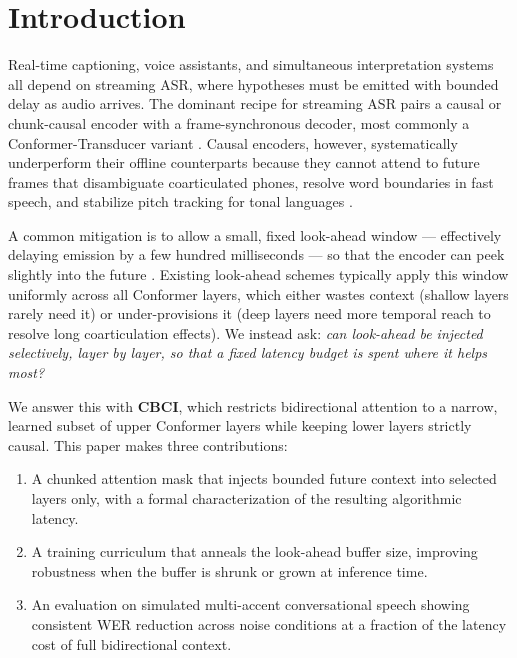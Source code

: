 \section{Introduction}
Real-time captioning, voice assistants, and simultaneous interpretation systems all depend on streaming
ASR, where hypotheses must be emitted with bounded delay as audio arrives. The dominant recipe for
streaming ASR pairs a causal or chunk-causal encoder with a frame-synchronous decoder, most commonly a
Conformer-Transducer variant \citep{okonkwo2024conformer,fischer2020ctc}. Causal encoders, however,
systematically underperform their offline counterparts because they cannot attend to future frames that
disambiguate coarticulated phones, resolve word boundaries in fast speech, and stabilize pitch tracking
for tonal languages \citep{schmidt2023wav2vec}.

A common mitigation is to allow a small, fixed look-ahead window --- effectively delaying emission by a
few hundred milliseconds --- so that the encoder can peek slightly into the future
\citep{martinez2022rnnt}. Existing look-ahead schemes typically apply this window uniformly across all
Conformer layers, which either wastes context (shallow layers rarely need it) or under-provisions it
(deep layers need more temporal reach to resolve long coarticulation effects). We instead ask: \emph{can
look-ahead be injected selectively, layer by layer, so that a fixed latency budget is spent where it
helps most?}

We answer this with \textbf{CBCI}, which restricts bidirectional attention to a narrow, learned subset
of upper Conformer layers while keeping lower layers strictly causal. This paper makes three
contributions:
\begin{enumerate}[leftmargin=1.4em,itemsep=1pt,topsep=2pt]
  \item A chunked attention mask that injects bounded future context into selected layers only, with a
  formal characterization of the resulting algorithmic latency.
  \item A training curriculum that anneals the look-ahead buffer size, improving robustness when the
  buffer is shrunk or grown at inference time.
  \item An evaluation on simulated multi-accent conversational speech showing consistent WER reduction
  across noise conditions at a fraction of the latency cost of full bidirectional context.
\end{enumerate}
